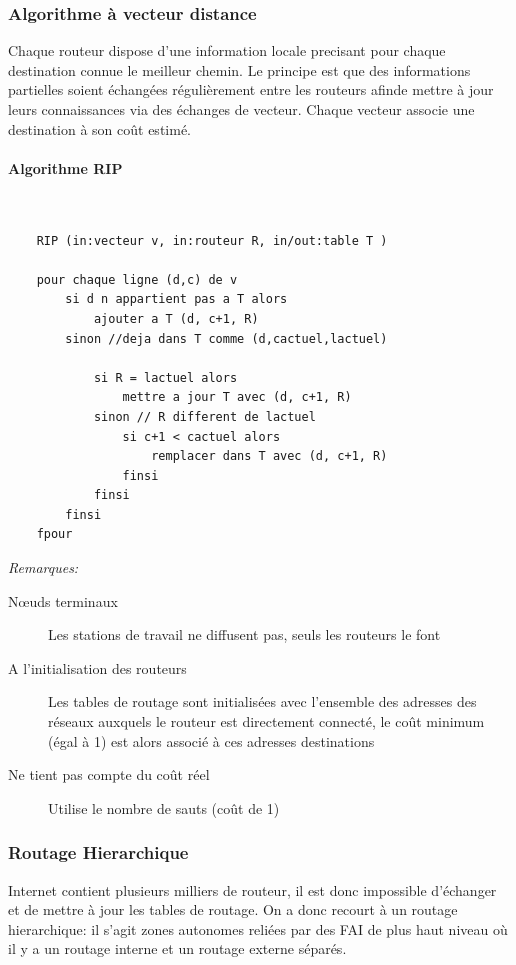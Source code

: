 \documentclass[a4paper, 12pt, french]{article}
\begin{document}
	\subsubsection{Algorithme à vecteur distance}

	Chaque routeur dispose d'une information locale precisant pour chaque destination connue le meilleur chemin. Le principe est que des informations partielles soient échangées régulièrement entre les routeurs afinde mettre à jour leurs connaissances via des échanges de vecteur. Chaque vecteur associe une destination à son coût estimé.

	\paragraph{Algorithme RIP}\mbox{}\\

	\begin{lstlisting}
	RIP (in:vecteur v, in:routeur R, in/out:table T )

	pour chaque ligne (d,c) de v
		si d n appartient pas a T alors
			ajouter a T (d, c+1, R)
		sinon //deja dans T comme (d,cactuel,lactuel)

			si R = lactuel alors
				mettre a jour T avec (d, c+1, R)
			sinon // R different de lactuel
				si c+1 < cactuel alors
					remplacer dans T avec (d, c+1, R)
				finsi
			finsi
		finsi
	fpour
	\end{lstlisting}

	\emph{Remarques:}
	\begin{description}
		\item[Nœuds terminaux] Les stations de travail ne diffusent pas, seuls les routeurs le font
		\item[A l'initialisation des routeurs] Les tables de routage sont initialisées avec l'ensemble des adresses des réseaux auxquels le routeur est directement connecté, le coût minimum (égal à  1) est alors associé à ces adresses destinations
		\item[Ne tient pas compte du coût réel] Utilise le nombre de sauts (coût de 1)
	\end{description}

	\subsubsection{Routage Hierarchique}

	Internet contient plusieurs milliers de routeur, il est donc impossible d'échanger et de mettre à jour les tables de routage. On a donc recourt à un routage hierarchique: il s'agit zones autonomes reliées par des FAI de plus haut niveau où il y a un routage interne et un routage externe séparés.
\end{document}
